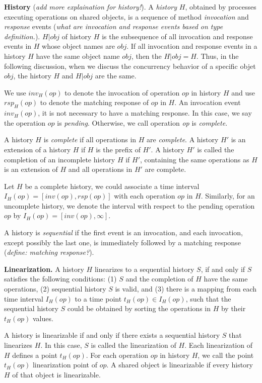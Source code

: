 \textbf{History}
(\emph{add more explaination for history!}).
A \emph{history} $H$, obtained by processes executing
operations on shared objects, is a sequence of method \emph{invocation} and \emph{response} events
(\emph{what are invocation and response events based on type definition.}). $H|obj$ of history $H$ is the subsequence of all
invocation and response events in $H$ whose object names are $obj$. If all invocation and response
events in a history $H$ have the same object name $obj$, then the $H|obj = H$. Thus, in the following discussion,
when we discuss the concurrency behavior of a specific objet $obj$, the history $H$ and $H|obj$ are the same.

We use $inv_H(op)$ to denote the invocation of operation $op$ in history $H$ and use $rsp_H(op)$ to
denote the matching response of $op$ in $H$. An invocation event $inv_H(op)$, it is not necessary to have a
matching response. In this case, we say the operation $op$ is \emph{pending}. Otherwise, we call operation \emph{op}
is \emph{complete}.

A history $H$ is \emph{complete} if all operations in $H$ are \emph{complete}. A history $H'$ is an extension of a history $H$
if $H$ is the prefix of $H'$. A history $H'$ is called the completion of an incomplete history $H$ if $H'$, containing the same
operations as $H$ is an extension of $H$ and all operations in $H'$ are complete.

Let $H$ be a complete history, we could associate a time interval $I_H(op) = [inv(op), rsp(op)]$ with each
operation $op$ in $H$. Similarly, for an uncomplete history, we denote the interval with respect to the pending
operation $op$ by $I_H(op) = [inv(op), \infty]$.

A history is \emph{sequential} if the first event is an invocation, and each invocation, except possibly the last
one, is immediately followed by a matching response (\emph{define: matching response?}).



\textbf{Linearization.}
A history $H$ linearizes to a sequential history $S$, if and only if $S$ satisfies the
following conditions: (1) $S$ and the completion of $H$ have the same operations, (2) sequential history $S$ is
valid, and (3) there is a mapping from each time interval $I_H(op)$ to a time point $t_H(op) \in I_H(op)$, such
that the sequential history $S$ could be obtained by sorting the operations in $H$ by their $t_H(op)$ values.

A history is linearizable if and only if there exists a sequential history $S$ that linearizes $H$. In this case,
$S$ is called the linearization of $H$. Each linearization of $H$ defines a point $t_H(op)$. For each operation $op$
in history $H$, we call the point $t_H(op)$ linearization point of $op$. A shared object is linearizable if every
history $H$ of that object is linearizable.



